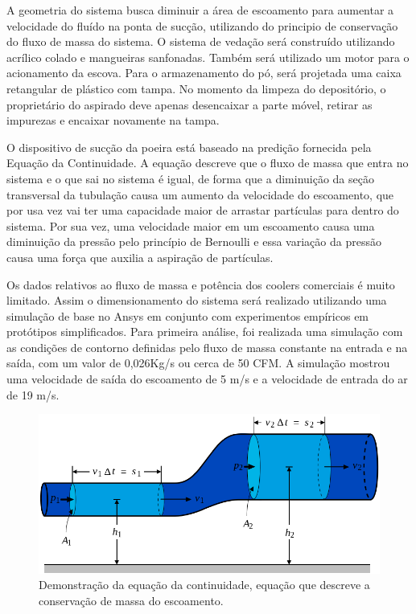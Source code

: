 		A geometria do sistema busca diminuir a área de escoamento para aumentar a velocidade do fluído na ponta de sucção, utilizando do principio de conservação do fluxo de massa do sistema. O sistema de vedação será construído utilizando acrílico colado e mangueiras sanfonadas. Também será utilizado um motor para o acionamento da escova. Para o armazenamento do pó, será projetada uma caixa retangular de plástico com tampa. No momento da limpeza do depositório, o proprietário do aspirado deve apenas desencaixar a parte móvel, retirar as impurezas e encaixar novamente na tampa.

		O dispositivo de sucção da poeira está baseado na predição fornecida pela Equação da Continuidade. A equação descreve que o fluxo de massa que entra no sistema e o que sai no sistema é igual, de forma que a diminuição da seção transversal da tubulação causa um aumento da velocidade do escoamento, que por usa vez vai ter uma capacidade maior de arrastar partículas para dentro do sistema. Por sua vez, uma velocidade maior em um escoamento causa uma diminuição da pressão pelo princípio de Bernoulli e essa variação da pressão causa uma força que auxilia a aspiração de partículas.

		Os dados relativos ao fluxo de massa e potência dos coolers comerciais é muito limitado. Assim o dimensionamento do sistema será realizado utilizando uma simulação de base no Ansys em conjunto com experimentos empíricos em protótipos simplificados. Para primeira análise, foi realizada uma simulação com as condições de contorno definidas pelo fluxo de massa constante na entrada e na saída, com um valor de 0,026Kg/s ou  cerca de 50 CFM. A simulação mostrou uma velocidade de saída do escoamento de 5 m/s e a velocidade de entrada do ar de 19 m/s.

		\begin{figure}[H]
			\centering
			\includegraphics[scale=0.4]{figuras/succao.png}
			\caption{Demonstração da equação da continuidade, equação que descreve a conservação de massa do escoamento.}
			\label{img:succao}
		\end{figure}

